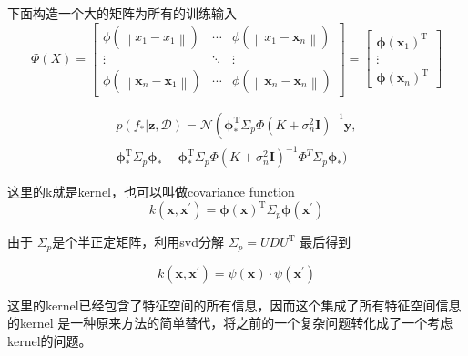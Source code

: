 \documentclass[a4paper, 12pt, CJKnumber, UTF8, openany,nofonts, fancyhdr]{ctexbook}
\begin{document}
下面构造一个大的矩阵为所有的训练输入
\begin{equation}
\Phi(X)=\left[ \begin{array}{ccc}{\phi\left(\left\|x_{1}-x_{1}\right\|\right)} & {\cdots} & {\phi\left(\left\|x_{1}-\boldsymbol{x}_{n}\right\|\right)} \\ {\vdots} & {\ddots} & {\vdots} \\ {\phi\left(\left\|\boldsymbol{x}_{n}-\boldsymbol{x}_{1}\right\|\right)} & {\cdots} & {\phi\left(\left\|\boldsymbol{x}_{n}-\boldsymbol{x}_{n}\right\|\right)}\end{array}\right]=\left[ \begin{array}{c}{\boldsymbol{\phi}\left(\boldsymbol{x}_{1}\right)^{\mathrm{T}}} \\ {\vdots} \\ {\boldsymbol{\phi}\left(\boldsymbol{x}_{n}\right)^{\mathrm{T}}}\end{array}\right]
\end{equation}

\begin{equation}
\begin{aligned} p\left(f_{*} | \boldsymbol{z}, \mathcal{D}\right)=\mathcal{N}\left(\boldsymbol{\phi}_{*}^{\mathrm{T}} \Sigma_{p} \Phi\left(K+\sigma_{n}^{2} \mathbf{I}\right)^{-1} \boldsymbol{y},\right.\\ \boldsymbol{\phi}_{*}^{\mathrm{T}} \Sigma_{p} \boldsymbol{\phi}_{*}-\boldsymbol{\phi}_{*}^{\mathrm{T}} \Sigma_{p} \Phi\left(K+\sigma_{n}^{2} \mathbf{I}\right)^{-1} \Phi^{T} \Sigma_{p} \boldsymbol{\phi}_{*} ) \end{aligned}
\end{equation}

这里的k就是kernel，也可以叫做covariance function 
\begin{equation}
k\left(\boldsymbol{x}, \boldsymbol{x}^{\prime}\right)=\boldsymbol{\phi}(\boldsymbol{x})^{\mathrm{T}} \Sigma_{p} \boldsymbol{\phi}\left(\boldsymbol{x}^{\prime}\right)
\end{equation}

由于 $\Sigma_p$是个半正定矩阵，利用svd分解 $\Sigma_{p}=U D U^{\mathrm{T}}$
最后得到

\begin{equation}
k\left(\boldsymbol{x}, \boldsymbol{x}^{\prime}\right)=\psi(\boldsymbol{x}) \cdot \psi\left(\boldsymbol{x}^{\prime}\right)
\end{equation}

这里的kernel已经包含了特征空间的所有信息，因而这个集成了所有特征空间信息的kernel
是一种原来方法的简单替代，将之前的一个复杂问题转化成了一个考虑kernel的问题。
\end{document}
